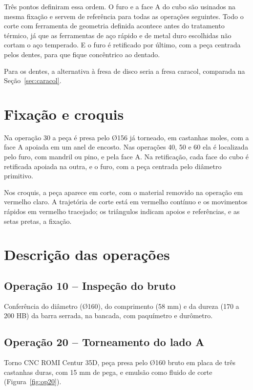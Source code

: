 Três pontos definiram essa ordem. O furo e a face A do cubo são usinados na mesma fixação e servem de referência para todas as operações seguintes. Todo o corte com ferramenta de geometria definida acontece antes do tratamento térmico, já que as ferramentas de aço rápido e de metal duro escolhidas não cortam o aço temperado. E o furo é retificado por último, com a peça centrada pelos dentes, para que fique concêntrico ao dentado.

Para os dentes, a alternativa à fresa de disco seria a fresa caracol, comparada na Seção~\ref{sec:caracol}.

\section{Fixação e croquis}

Na operação 30 a peça é presa pelo Ø156 já torneado, em castanhas moles, com a face A apoiada em um anel de encosto. Nas operações 40, 50 e 60 ela é localizada pelo furo, com mandril ou pino, e pela face A. Na retificação, cada face do cubo é retificada apoiada na outra, e o furo, com a peça centrada pelo diâmetro primitivo.

Nos croquis, a peça aparece em corte, com o material removido na operação em vermelho claro. A trajetória de corte está em vermelho contínuo e os movimentos rápidos em vermelho tracejado; os triângulos indicam apoios e referências, e as setas pretas, a fixação.

\section{Descrição das operações}

\subsection*{Operação 10 – Inspeção do bruto}

Conferência do diâmetro (Ø160), do comprimento (58 mm) e da dureza (170 a 200 HB) da barra serrada, na bancada, com paquímetro e durômetro.

\subsection*{Operação 20 – Torneamento do lado A}

Torno CNC ROMI Centur 35D, peça presa pelo Ø160 bruto em placa de três castanhas duras, com 15 mm de pega, e emulsão como fluido de corte (Figura~\ref{fig:op20}).

